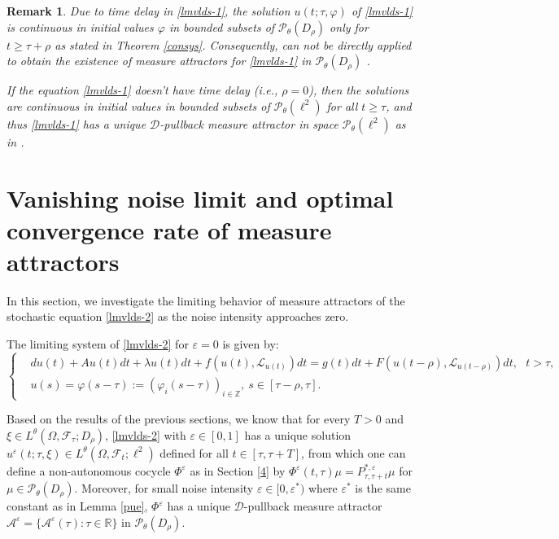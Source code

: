 \documentclass[11pt]{article}
\numberwithin{equation}{section}
\theoremstyle{plain}
\newtheorem{remark}{Remark}[section]
\begin{document}
\begin{remark} \label{difference}
 Due to  time delay in \eqref{lmvlds-1},
 the solution $u(t; \tau, \varphi)$ of \eqref{lmvlds-1} is continuous 
 in initial values $\varphi$ in bounded subsets 
 of $\mathcal{P}_{\theta}(D_{\rho})$
 only for   $t \ge \tau + \rho$ as stated 
  in Theorem \ref{consys}.
 Consequently,  \cite[Proposition 2.2]{SSW2026JDE} 
 can not be directly
  applied  to obtain the existence of 
 measure attractors for \eqref{lmvlds-1}  in  
  $\mathcal{P}_{\theta}(D_{\rho})$ .
   
 If the equation \eqref{lmvlds-1} doesn't have time delay (i.e., $\rho =0$), 
 then the solutions are continuous in initial values in bounded subsets of $\mathcal{P}_{\theta}(\ell^2)$ for all $t \ge \tau$, 
 and thus \eqref{lmvlds-1} has a unique $\mathcal{D}$-pullback measure attractor in space $\mathcal{P}_\theta(\ell^2)$ as in \cite{BCS2026JDE}.
 \end{remark}


\section{Vanishing noise limit and optimal convergence rate of measure attractors} \label{5}

 In this section, we investigate the limiting behavior of measure attractors of
 the stochastic equation \eqref{lmvlds-2} as the noise intensity approaches zero.

 The limiting system of \eqref{lmvlds-2} for $\varepsilon = 0$ is given by:
 \begin{equation}\label{lds}
  \left\{
  \begin{aligned}
        & d u (t)
              + Au(t) dt
              + \lambda u(t) dt
              + f(u(t),\mathcal{L}_{u(t)}) dt 
          = g(t) dt + F( u(t-\rho), \mathcal{L}_{u(t-\rho) } ) dt, \ \ \  t > \tau,  \\
       & u(s) = \varphi(s-\tau) := ( \varphi_i(s-\tau) )_{i \in \mathbb{Z}},\  s \in  [\tau-\rho, \tau].
  \end{aligned}
  \right.
 \end{equation}

 Based on the results of the previous sections, 
 we know that for every $T>0$ and
       $\xi \in L^{\theta}(\Omega,\mathcal{F}_\tau; D_\rho)$, 
 \eqref{lmvlds-2} with $\varepsilon \in [0, 1]$ has a unique solution
       $u^\varepsilon(t; \tau, \xi) \in L^{\theta}(\Omega, \mathcal{F}_t; \ell^2)$
 defined for all $t \in [\tau, \tau +T]$,
 from which one can define a non-autonomous cocycle $\Phi^\varepsilon$ as in Section \ref{4} by 
        $\Phi^\varepsilon(t,\tau) \mu = P^{\ast,\varepsilon}_{\tau, \tau + t} \mu$
  for $\mu \in \mathcal{P}_\theta(D_\rho)$.
 Moreover, for small noise intensity $\varepsilon \in [0, \varepsilon^*)$ where $\varepsilon^*$ is the same constant as in Lemma \ref{pue},
 $\Phi^\varepsilon$ has a unique $\mathcal{D}$-pullback measure attractor
     $\mathcal{A}^\varepsilon = \{ \mathcal{A}^\varepsilon(\tau) : \tau \in \mathbb{R} \}$
 in $\mathcal{P}_{\theta}(D_\rho)$.
 
\end{document}
